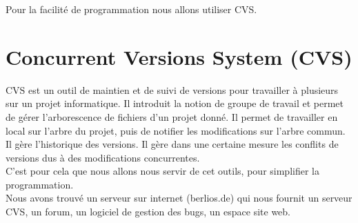 Pour la facilit{\'e} de programmation nous allons utiliser CVS.\\

\section{Concurrent Versions System (CVS)}

CVS est un outil de maintien et de suivi de versions pour travailler {\`a} plusieurs sur un projet informatique.
Il introduit la notion de groupe de travail et  permet de g{\'e}rer l'arborescence de fichiers d'un projet donn{\'e}.
Il permet de travailler en local sur l'arbre du projet, puis de notifier les modifications sur l'arbre commun. Il g{\`e}re l'historique des versions. Il g{\`e}re dans une certaine mesure les conflits de versions dus {\`a} des modifications concurrentes.\\

C'est pour cela que nous allons nous servir de cet outils, pour simplifier la programmation.\\
Nous avons trouv{\'e} un serveur sur internet (berlios.de) qui nous fournit un serveur CVS, un forum, un logiciel de gestion des bugs, un espace site web.\\


